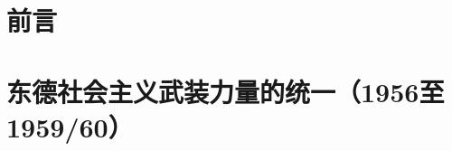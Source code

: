 \documentclass[a4paper, twocolumn, zihao = -4]{ctexbook}
\begin{document}
\chapter*{前言}


% 
\chapter{东德社会主义武装力量的统一（1956至1959/60）}

% 


\end{document}
